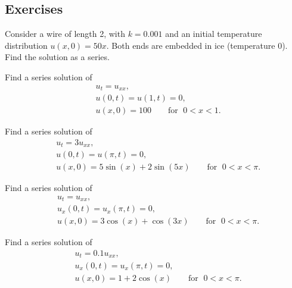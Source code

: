\subsection{Exercises}

\begin{exercise}
Consider a wire of length 2, with $k=0.001$ and an initial
temperature distribution $u(x,0) = 50 x$.  Both ends
are embedded in ice (temperature 0).  Find the solution as a series.
\end{exercise}

\begin{exercise}
Find a series solution of
\begin{align*}
& u_t =  u_{xx} , \\
& u(0,t) = u(1,t) = 0 , \\
& u(x,0) = 100 \qquad \text{for } \; 0 < x < 1 .
\end{align*}
\end{exercise}

\begin{exercise}\ansMark%
Find a series solution of
\begin{align*}
& u_t =  3 u_{xx} , \\
& u(0,t) = u(\pi,t) = 0 , \\
& u(x,0) = 5\sin (x) + 2\sin (5x) \qquad \text{for } \; 0 < x < \pi .
\end{align*}
\end{exercise}

\begin{exercise}
Find a series solution of
\begin{align*}
& u_t =  u_{xx} , \\
& u_x(0,t) = u_x(\pi,t) = 0 , \\
& u(x,0) = 3\cos (x) + \cos (3x) \qquad \text{for } \; 0 < x < \pi .
\end{align*}
\end{exercise}

\begin{exercise}\ansMark%
Find a series solution of
\begin{align*}
& u_t =  0.1 u_{xx} , \\
& u_x(0,t) = u_x(\pi,t) = 0 , \\
& u(x,0) = 1 + 2\cos (x) \qquad \text{for } \; 0 < x < \pi .
\end{align*}
\end{exercise}

